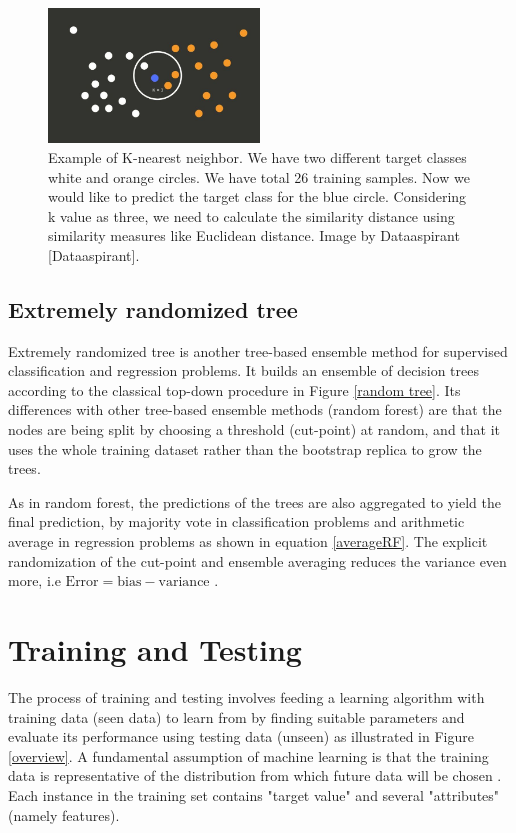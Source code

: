 \begin{figure}[H]
  \centering
    \includegraphics[width=0.5\textwidth]{images/Kn.jpg}
    \caption{Example of K-nearest neighbor. We have two different target classes white and orange circles. We have total 26 training samples. Now we would like to predict the target class for the blue circle. Considering k value as three, we need to calculate the similarity distance using similarity measures like Euclidean distance. Image by Dataaspirant [Dataaspirant].}
  \label{kn}
\end{figure}

\subsection{Extremely randomized tree}

Extremely randomized tree is another tree-based ensemble method for supervised classification and regression problems. It builds an ensemble of decision trees according to the classical top-down procedure in Figure \ref{random tree}. Its differences with other tree-based ensemble methods (random forest) are that the nodes are being split by choosing a threshold (cut-point) at random, and that it uses the whole training dataset rather than the bootstrap replica to grow the trees.  

As in random forest, the predictions of the trees are also aggregated to yield the final prediction, by majority vote in classification problems and arithmetic average in regression problems as shown in equation \ref{averageRF}. The explicit randomization of the cut-point and ensemble averaging reduces the variance even more, i.e $\text{Error}=\text{bias} - \text{variance}$ \citep{geurts2006extremely}. 
\section{Training and Testing}
\label{TT}
The process of training and testing involves feeding a learning algorithm with training data (seen data) to learn from by finding suitable parameters and evaluate its performance using testing data (unseen) as illustrated in Figure \ref{overview}. A fundamental assumption of machine learning is that the training data is representative of the distribution from which future data  will be chosen \citep{witten2016data}. Each instance in the training set contains "target value" and several "attributes" (namely features). 


